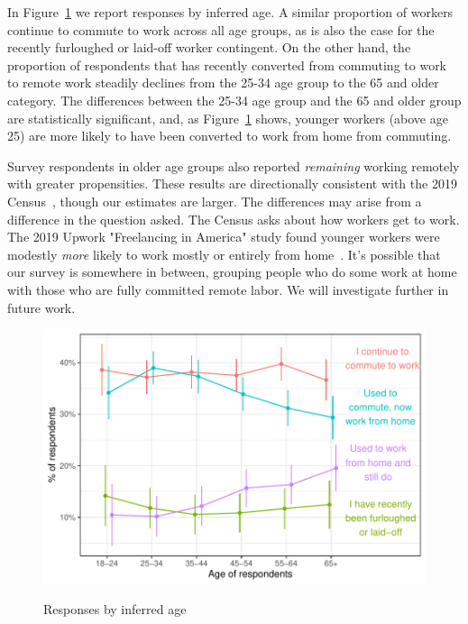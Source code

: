 \documentclass[12pt]{article}
\begin{document}
In Figure~\ref{fig:by_age} we report responses by inferred age. A similar proportion of workers continue to commute to work across all age groups, as is also the case for the recently furloughed or laid-off worker contingent. On the other hand, the proportion of respondents that has recently converted from commuting to work to remote work steadily declines from the 25-34 age group to the 65 and older category. The differences between the 25-34 age group and the 65 and older group are statistically significant, and, as Figure~\ref{fig:by_age} shows, younger workers (above age 25) are more likely to have been converted to work from home from commuting. 

Survey respondents in older age groups also reported \emph{remaining} working remotely with greater propensities. These results are directionally consistent with the 2019 Census~\cite{ACSTableB08101}, though our estimates are larger. The differences may arise from a difference in the question asked. The Census asks about how workers get to work. The 2019 Upwork "Freelancing in America" study found younger workers were modestly \emph{more} likely to work mostly or entirely from home~\cite{upwork2019}. It's possible that our survey is somewhere in between, grouping people who do some work at home with those who are fully committed remote labor. We will investigate further in future work.
\begin{figure}
  \caption{Responses by inferred age} \label{fig:by_age}
\centering
\begin{minipage}{1.0 \linewidth}
  \includegraphics[width = \linewidth]{plots/by_age.pdf} \\
  \begin{footnotesize}
    \begin{singlespace}
    \end{singlespace}
    \end{footnotesize}
\end{minipage}
\end{figure} 
\end{document}
